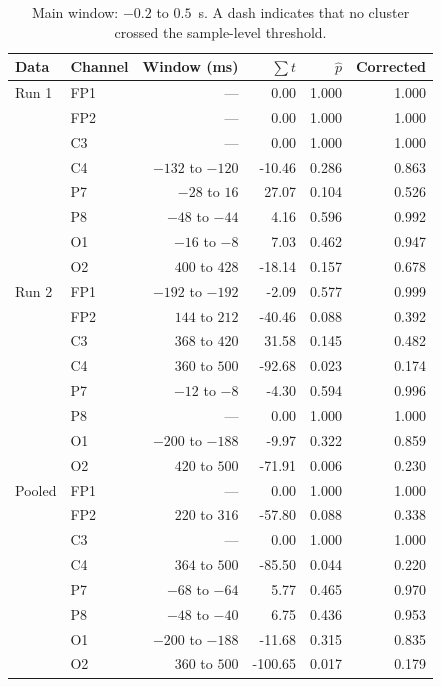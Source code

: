 \documentclass[11pt,a4paper]{article}
\renewcommand{\arraystretch}{1.13}
\begin{document}
\footnotesize
\renewcommand{\arraystretch}{1.0}
\begin{table}[!htbp]
\centering
\caption{Main window: $-0.2$ to $0.5$~s. A dash indicates that no cluster crossed the sample-level threshold.}
\begin{tabular}{llrrrr}
\toprule
Data & Channel & Window (ms) & $\sum t$ & $\hat p$ & Corrected \\
\midrule
Run 1 & FP1 & --- & 0.00 & 1.000 & 1.000 \\
 & FP2 & --- & 0.00 & 1.000 & 1.000 \\
 & C3 & --- & 0.00 & 1.000 & 1.000 \\
 & C4 & $-132$ to $-120$ & -10.46 & 0.286 & 0.863 \\
 & P7 & $-28$ to $16$ & 27.07 & 0.104 & 0.526 \\
 & P8 & $-48$ to $-44$ & 4.16 & 0.596 & 0.992 \\
 & O1 & $-16$ to $-8$ & 7.03 & 0.462 & 0.947 \\
 & O2 & $400$ to $428$ & -18.14 & 0.157 & 0.678 \\
\addlinespace[5pt]
Run 2 & FP1 & $-192$ to $-192$ & -2.09 & 0.577 & 0.999 \\
 & FP2 & $144$ to $212$ & -40.46 & 0.088 & 0.392 \\
 & C3 & $368$ to $420$ & 31.58 & 0.145 & 0.482 \\
 & C4 & $360$ to $500$ & -92.68 & 0.023 & 0.174 \\
 & P7 & $-12$ to $-8$ & -4.30 & 0.594 & 0.996 \\
 & P8 & --- & 0.00 & 1.000 & 1.000 \\
 & O1 & $-200$ to $-188$ & -9.97 & 0.322 & 0.859 \\
 & O2 & $420$ to $500$ & -71.91 & 0.006 & 0.230 \\
\addlinespace[5pt]
Pooled & FP1 & --- & 0.00 & 1.000 & 1.000 \\
 & FP2 & $220$ to $316$ & -57.80 & 0.088 & 0.338 \\
 & C3 & --- & 0.00 & 1.000 & 1.000 \\
 & C4 & $364$ to $500$ & -85.50 & 0.044 & 0.220 \\
 & P7 & $-68$ to $-64$ & 5.77 & 0.465 & 0.970 \\
 & P8 & $-48$ to $-40$ & 6.75 & 0.436 & 0.953 \\
 & O1 & $-200$ to $-188$ & -11.68 & 0.315 & 0.835 \\
 & O2 & $360$ to $500$ & -100.65 & 0.017 & 0.179 \\
\bottomrule
\end{tabular}
\end{table}
\end{document}
